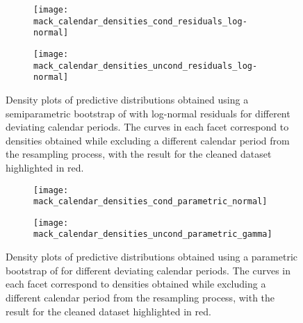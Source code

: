 \documentclass[a4paper]{book}
\begin{document}
\begin{landscape}
  \begin{figure}
    \begin{subfigure}{0.5\linewidth}
      \centering
      \texttt{[image: mack\_calendar\_densities\_cond\_residuals\_log-normal]}
      \label{fig:mack-calendar-cond-semiparam-log-normal}
    \end{subfigure}
    \begin{subfigure}{0.5\linewidth}
      \centering
      \texttt{[image: mack\_calendar\_densities\_uncond\_residuals\_log-normal]}
      \label{fig:mack-calendar-uncond-semiparam-log-normal}
    \end{subfigure}
    \caption[Calendar outlier density plots for Mack's model, semiparametric bootstrap with log-normal residuals]{Density plots of predictive distributions obtained using a semiparametric bootstrap of  with log-normal residuals for different deviating calendar periods. The curves in each facet correspond to densities obtained while excluding a different calendar period from the resampling process, with the result for the cleaned dataset highlighted in red.}
  \end{figure}
\end{landscape}

\begin{landscape}
  \begin{figure}
    \begin{subfigure}{0.5\linewidth}
      \centering
      \texttt{[image: mack\_calendar\_densities\_cond\_parametric\_normal]}
      \label{fig:mack-calendar-cond-param-normal}
    \end{subfigure}
    \begin{subfigure}{0.5\linewidth}
      \centering
      \texttt{[image: mack\_calendar\_densities\_uncond\_parametric\_gamma]}
      \label{fig:mack-calendar-uncond-param-gamma}
    \end{subfigure}
    \caption[Calendar outlier density plots for Mack's model, parametric bootstrap]{Density plots of predictive distributions obtained using a parametric bootstrap of  for different deviating calendar periods. The curves in each facet correspond to densities obtained while excluding a different calendar period from the resampling process, with the result for the cleaned dataset highlighted in red.}
  \end{figure}
\end{landscape}
\end{document}
